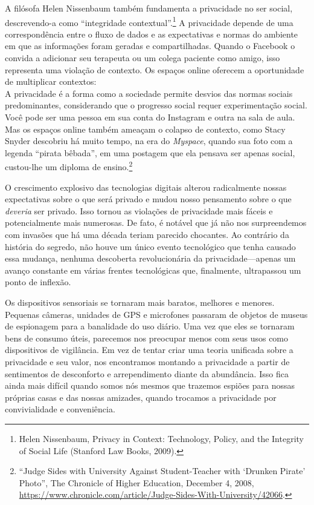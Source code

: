 \documentclass{book}
\newcommand{\ingles}[1]{\textit{#1}}
\begin{document}
A filósofa Helen Nissenbaum também fundamenta a privacidade no ser social,
descrevendo-a como ``integridade contextual''.\footnote{Helen Nissenbaum, Privacy
in Context: Technology, Policy, and the Integrity of Social Life (Stanford Law
Books, 2009).} A privacidade depende de uma correspondência entre o fluxo de dados
e as expectativas e normas do ambiente em que as informações foram geradas e
compartilhadas. Quando o Facebook o convida a adicionar seu terapeuta ou um colega
paciente como amigo, isso representa uma violação de contexto. Os espaços online
oferecem a oportunidade de multiplicar contextos:\\

A privacidade é a forma como a sociedade permite desvios das normas sociais
predominantes, considerando que o progresso social requer experimentação social.\\

Você pode ser uma pessoa em sua conta do Instagram e outra na sala de aula. Mas
os espaços online também ameaçam o colapso de contexto, como Stacy Snyder
descobriu há muito tempo, na era do \ingles{Myspace}, quando sua foto com a legenda
``pirata bêbada'', em uma postagem que ela pensava ser apenas social, custou-lhe 
um diploma de ensino.\footnote{``Judge Sides with University Against Student-Teacher
with ‘Drunken Pirate’ Photo'', The Chronicle of Higher Education, December 4,
2008, \url{https://www.chronicle.com/article/Judge-Sides-With-University/42066}.}

O crescimento explosivo das tecnologias digitais alterou radicalmente nossas
expectativas sobre o que será privado e mudou nosso pensamento sobre o que
\emph{deveria} ser privado. Isso tornou as violações de privacidade mais fáceis e 
potencialmente mais numerosas. De fato, é notável que já não nos surpreendemos
com invasões que há uma década teriam parecido chocantes. Ao contrário da
história do segredo, não houve um único evento tecnológico que tenha causado
essa mudança, nenhuma descoberta revolucionária da privacidade---apenas um
avanço constante em várias frentes tecnológicas que, finalmente, ultrapassou
um ponto de inflexão.

Os dispositivos sensoriais se tornaram mais baratos, melhores e menores.
Pequenas câmeras, unidades de GPS e microfones passaram de objetos de museus
de espionagem para a banalidade do uso diário. Uma vez que eles se tornaram
bens de consumo úteis, parecemos nos preocupar menos com seus usos como
dispositivos de vigilância. Em vez de tentar criar uma teoria unificada sobre
a privacidade e seu valor, nos encontramos montando a privacidade a partir de
sentimentos de desconforto e arrependimento diante da abundância. Isso fica
ainda mais difícil quando somos nós mesmos que trazemos espiões para nossas
próprias casas e das nossas amizades, quando trocamos a privacidade por
convivialidade e conveniência.
\end{document}
